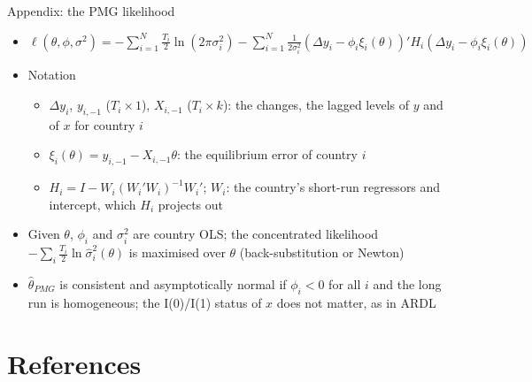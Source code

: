 \begin{frame}{Appendix: the PMG likelihood}
\hypertarget{atsapp3}{}
\itemsize{\small}
\begin{itemize}
    \item $\ell(\theta, \phi, \sigma^2) = -\sum_{i=1}^N\frac{T_i}{2}\ln(2\pi\sigma_i^2) - \sum_{i=1}^N\frac{1}{2\sigma_i^2}(\Delta y_i - \phi_i\xi_i(\theta))'H_i(\Delta y_i - \phi_i\xi_i(\theta))$
    \item Notation
    \begin{itemize}
        \item $\Delta y_i$, $y_{i,-1}$ ($T_i\times 1$), $X_{i,-1}$ ($T_i\times k$): the changes, the lagged levels of $y$ and of $x$ for country $i$
        \item $\xi_i(\theta) = y_{i,-1} - X_{i,-1}\theta$: the equilibrium error of country $i$
        \item $H_i = I - W_i(W_i'W_i)^{-1}W_i'$; $W_i$: the country's short-run regressors and intercept, which $H_i$ projects out
    \end{itemize}
    \item Given $\theta$, $\phi_i$ and $\sigma_i^2$ are country OLS; the concentrated likelihood $-\sum_i\frac{T_i}{2}\ln\hat\sigma_i^2(\theta)$ is maximised over $\theta$ (back-substitution or Newton)
    \item $\hat\theta_{PMG}$ is consistent and asymptotically normal if $\phi_i < 0$ for all $i$ and the long run is homogeneous; the I(0)/I(1) status of $x$ does not matter, as in ARDL
\end{itemize}
\end{frame}


\section{References}

